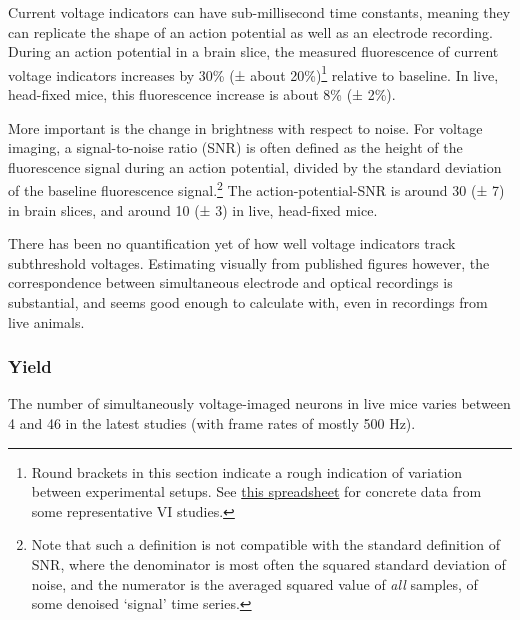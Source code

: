 Current voltage indicators can have sub-millisecond time constants, meaning they can replicate the shape of an action potential as well as an electrode recording. During an action potential in a brain slice, the measured fluorescence of current voltage indicators increases by 30\% (± about 20\%)\cite{Piatkevich2019PopulationImagingNeural,Adam2019VoltageImagingOptogenetics}\footnote{
    Round brackets in this section indicate a rough indication of variation between experimental setups. See \href{https://docs.google.com/spreadsheets/d/1W9Y3az4i1xdvahpdyqtsTG8F81LXK2T6wzRgsXHN3z0/edit}{this spreadsheet} for concrete data from some representative VI studies.
}
relative to baseline. In live, head-fixed mice, this fluorescence increase is about 8\% (± 2\%).\cite{Abdelfattah2019BrightPhotostableChemigenetic,Villette2019UltrafastTwoPhotonImaging}

More important is the change in brightness with respect to noise. For voltage imaging, a signal-to-noise ratio (SNR) is often defined as the height of the fluorescence signal during an action potential, divided by the standard deviation of the baseline fluorescence signal.\footnote{
    Note that such a definition is not compatible with the standard definition of SNR, where the denominator is most often the squared standard deviation of noise, and the numerator is the averaged squared value of \emph{all} samples, of some denoised `signal' time series.
}
The action-potential-SNR is around 30 (± 7) in brain slices\cite{Adam2019VoltageImagingOptogenetics,Piatkevich2019PopulationImagingNeural}, and around 10 (± 3) in live, head-fixed mice.\cite{Abdelfattah2019BrightPhotostableChemigenetic,Villette2019UltrafastTwoPhotonImaging}

There has been no quantification yet of how well voltage indicators track subthreshold voltages. Estimating visually from published figures however, the correspondence between simultaneous electrode and optical recordings is substantial, and seems good enough to calculate with, even in recordings from live animals.


\subsubsection{Yield}

The number of simultaneously voltage-imaged neurons in live mice varies between 4 and 46 in the latest studies (with frame rates of mostly 500 Hz).\cite{Adam2019VoltageImagingOptogenetics,Villette2019UltrafastTwoPhotonImaging,Abdelfattah2019BrightPhotostableChemigenetic,Piatkevich2019PopulationImagingNeural}

